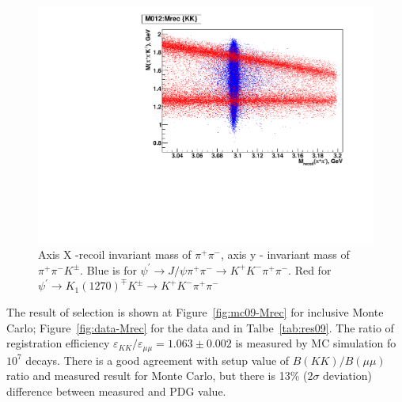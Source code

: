 \documentclass[a4paper,12pt]{article}
\begin{document}
\begin{figure}
	\includegraphics[width=\textwidth]{fig/M012_Mrec-color.pdf}
	\caption{Axis X -recoil invariant mass of $\pi^+\pi^-$,  axis y - invariant
	mass of $\pi^+\pi^-K^\pm$.  Blue is for $\psi^\prime \to J/\psi \pi^+\pi^-
	\to K^+K^-\pi^+\pi^-$. Red for $\psi^\prime \to K_1(1270)^\mp K^\pm  \to
	K^+K^-\pi^+\pi^-$}
  \label{fig:M012_Mrec}
\end{figure}




The result of selection is shown at Figure~\ref{fig:mc09-Mrec} for inclusive
Monte Carlo; Figure~\ref{fig:data-Mrec} for the data and in
Talbe~\ref{tab:res09}.  The ratio of registration efficiency
$\varepsilon_{KK}/\varepsilon_{\mu\mu}= 1.063 \pm 0.002$ is measured by MC
simulation fo $10^7$ decays.  There is a good agreement with setup value of
$B(KK)/B(\mu\mu)$ ratio and measured result for Monte Carlo, but there is 13\%
($2\sigma$ deviation) difference between measured and PDG value.
\end{document}
